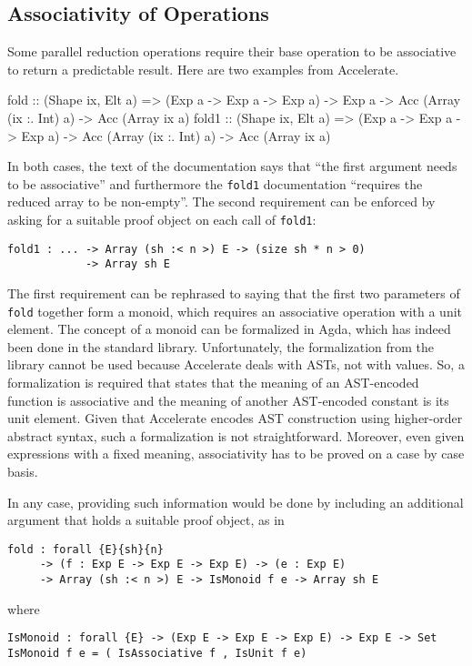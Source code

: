 \documentclass{llncs}
\begin{document}
\subsection{Associativity of Operations}
\label{sec:assoc-oper}

Some parallel reduction operations require their base operation to be
associative to return a predictable result. Here are two examples from
Accelerate. 
\begin{hcode}
fold  :: (Shape ix, Elt a) =>
         (Exp a -> Exp a -> Exp a) -> Exp a ->
         Acc (Array (ix :. Int) a) -> Acc (Array ix a)
fold1 :: (Shape ix, Elt a) =>
         (Exp a -> Exp a -> Exp a) ->
         Acc (Array (ix :. Int) a) -> Acc (Array ix a)
\end{hcode}
In both cases, the text of the documentation says that ``the first
argument needs to be associative'' and furthermore the \texttt{fold1}
documentation ``requires the reduced array to be non-empty''.
The second requirement can be enforced by asking for a suitable proof
object on each call of \texttt{fold1}:
\begin{verbatim}
fold1 : ... -> Array (sh :< n >) E -> (size sh * n > 0)
            -> Array sh E
\end{verbatim}
The first requirement can be rephrased to saying that the first two
parameters of \texttt{fold} together form a monoid, which requires an
associative operation with a unit element. The concept of a monoid
can be formalized in Agda, which has indeed been done in the standard
library. Unfortunately, the formalization from the library cannot be
used because Accelerate deals with ASTs, not with values. So, a
formalization is required that states that the meaning of an
AST-encoded function is associative and the meaning of another
AST-encoded constant is its unit element. Given that Accelerate
encodes AST construction using higher-order abstract syntax, such a
formalization is not straightforward. Moreover, even given expressions
with a fixed meaning, associativity has to be proved on a case by case
basis.

In any case, providing such information would be done by including an
additional argument that holds a suitable proof object, as in
\begin{verbatim}
fold : forall {E}{sh}{n}
     -> (f : Exp E -> Exp E -> Exp E) -> (e : Exp E)
     -> Array (sh :< n >) E -> IsMonoid f e -> Array sh E
\end{verbatim}
where
\begin{verbatim}
IsMonoid : forall {E} -> (Exp E -> Exp E -> Exp E) -> Exp E -> Set
IsMonoid f e = ( IsAssociative f , IsUnit f e)
\end{verbatim}
\end{document}
